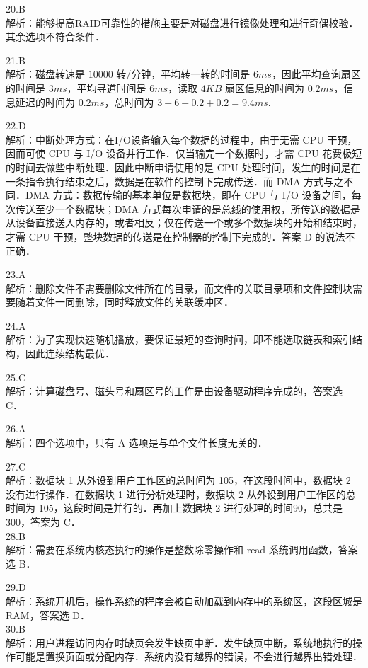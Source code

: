 20.B \\
解析：能够提高RAID可靠性的措施主要是对磁盘进行镜像处理和进行奇偶校验．其余选项不符合条件． 

21.B \\
解析：磁盘转速是 $10 000$ 转/分钟，平均转一转的时间是 $6ms$，因此平均查询扇区的时间是 $3ms$，平均寻道时间是 $6ms$，读取 $4KB$ 扇区信息的时间为 $0.2ms$，信息延迟的时间为 $0.2ms$，总时间为 $3+6+0.2+0.2=9.4ms$.

22.D \\
解析：中断处理方式：在I/O设备输入每个数据的过程中，由于无需 CPU 干预，因而可使 CPU 与 I/O 设备并行工作．仅当输完一个数据时，才需 CPU 花费极短的时间去做些中断处理．因此中断申请使用的是 CPU 处理时间，发生的时间是在一条指令执行结束之后，数据是在软件的控制下完成传送．而 DMA 方式与之不同．DMA 方式：数据传输的基本单位是数据块，即在 CPU 与 I/O 设备之间，每次传送至少一个数据块；DMA 方式每次申请的是总线的使用权，所传送的数据是从设备直接送入内存的，或者相反；仅在传送一个或多个数据块的开始和结束时，才需 CPU 干预，整块数据的传送是在控制器的控制下完成的．答案 D 的说法不正确． 

23.A \\
解析：删除文件不需要删除文件所在的目录，而文件的关联目录项和文件控制块需要随着文件一同删除，同时释放文件的关联缓冲区．

24.A \\
解析：为了实现快速随机播放，要保证最短的查询时间，即不能选取链表和索引结构，因此连续结构最优．

25.C \\
解析：计算磁盘号、磁头号和扇区号的工作是由设备驱动程序完成的，答案选 C．

26.A \\
解析：四个选项中，只有 A 选项是与单个文件长度无关的．

27.C \\
解析：数据块 1 从外设到用户工作区的总时间为 105，在这段时间中，数据块 2 没有进行操作．在数据块 1 进行分析处理时，数据块 2 从外设到用户工作区的总时间为 105，这段时间是并行的．再加上数据块 2 进行处理的时间90，总共是 300，答案为 C． \\

28.B \\
解析：需要在系统内核态执行的操作是整数除零操作和 read 系统调用函数，答案选 B．

29.D \\
解析：系统开机后，操作系统的程序会被自动加载到内存中的系统区，这段区城是 RAM，答案选 D． \\

30.B \\
解析：用户进程访问内存时缺页会发生缺页中断．发生缺页中断，系统地执行的操作可能是置换页面或分配内存．系统内没有越界的错误，不会进行越界出错处理． \\

